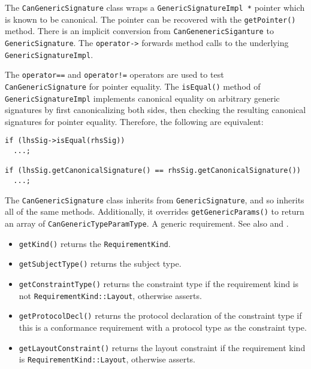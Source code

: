 \documentclass[../generics]{subfiles}
\begin{document}
The \texttt{CanGenericSignature} class wraps a \texttt{GenericSignatureImpl *} pointer which is known to be canonical. The pointer can be recovered with the \texttt{getPointer()} method. There is an implicit conversion from \texttt{CanGenenericSiganture} to \texttt{GenericSignature}. The \texttt{operator->} forwards method calls to the underlying \texttt{GenericSignatureImpl}.

The \texttt{operator==} and \texttt{operator!=} operators are used to test \texttt{CanGenericSignature} for pointer equality. The \texttt{isEqual()} method of \texttt{GenericSignatureImpl} implements canonical equality on arbitrary generic signatures by first canonicalizing both sides, then checking the resulting canonical signatures for pointer equality. Therefore, the following are equivalent:
\begin{Verbatim}
if (lhsSig->isEqual(rhsSig))
  ...;

if (lhsSig.getCanonicalSignature() == rhsSig.getCanonicalSignature())
  ...;
\end{Verbatim}
The \texttt{CanGenericSignature} class inherits from \texttt{GenericSignature}, and so inherits all of the same methods. Additionally, it overrides \texttt{getGenericParams()} to return an array of \texttt{CanGenericTypeParamType}.
A generic requirement. See also  and .
\begin{itemize}
\item \texttt{getKind()} returns the \texttt{RequirementKind}.
\item \texttt{getSubjectType()} returns the subject type.
\item \texttt{getConstraintType()} returns the constraint type if the requirement kind is not \texttt{RequirementKind::Layout}, otherwise asserts.
\item \texttt{getProtocolDecl()} returns the protocol declaration of the constraint type if this is a conformance requirement with a protocol type as the constraint type.
\item \texttt{getLayoutConstraint()} returns the layout constraint if the requirement kind is \texttt{RequirementKind::Layout}, otherwise asserts.
\end{itemize}
\end{document}
